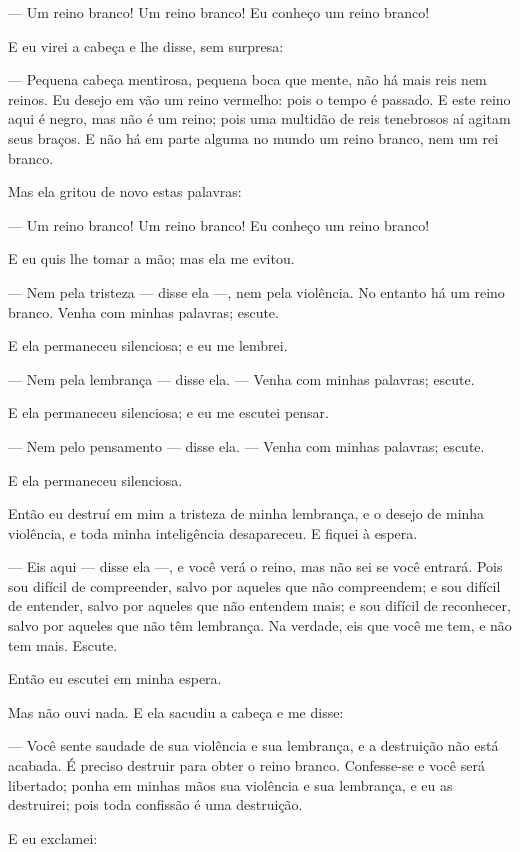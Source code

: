--- Um reino branco! Um reino branco! Eu conheço um reino branco!

E eu virei a cabeça e lhe disse, sem surpresa:

--- Pequena cabeça mentirosa, pequena boca que mente, não há mais reis
nem reinos. Eu desejo em vão um reino vermelho: pois o tempo é passado. E
este reino aqui é negro, mas não é um reino; pois uma multidão de reis
tenebrosos aí agitam seus braços. E não há em parte alguma no mundo um
reino branco, nem um rei branco.

Mas ela gritou de novo estas palavras:

--- Um reino branco! Um reino branco! Eu conheço um reino branco!

E eu quis lhe tomar a mão; mas ela me evitou.

--- Nem pela tristeza --- disse ela ---, nem pela violência. No entanto há um
reino branco. Venha com minhas palavras; escute.

E ela permaneceu silenciosa; e eu me lembrei.

--- Nem pela lembrança --- disse ela.  --- Venha com minhas palavras; escute.

E ela permaneceu silenciosa; e eu me escutei pensar.

--- Nem pelo pensamento --- disse ela. --- Venha com minhas palavras; escute.

E ela permaneceu silenciosa.

Então eu destruí em mim a tristeza de minha lembrança, e o desejo de
minha violência, e toda minha inteligência desapareceu. E fiquei à espera.

--- Eis aqui --- disse ela ---, e você verá o reino, mas não sei se você
entrará. Pois sou difícil de compreender, salvo por aqueles que não
compreendem; e sou difícil de entender, salvo por aqueles que não entendem
mais; e sou difícil de reconhecer, salvo por aqueles que não têm
lembrança. Na verdade, eis que você me tem, e não tem mais. Escute.

Então eu escutei em minha espera.

Mas não ouvi nada. E ela sacudiu a cabeça e me disse:

--- Você sente saudade de sua violência e sua lembrança, e a destruição
não está acabada. É preciso destruir para obter o reino branco.
Confesse-se e você será libertado; ponha em minhas mãos sua violência e
sua lembrança, e eu as destruirei; pois toda confissão é uma destruição.

E eu exclamei:

